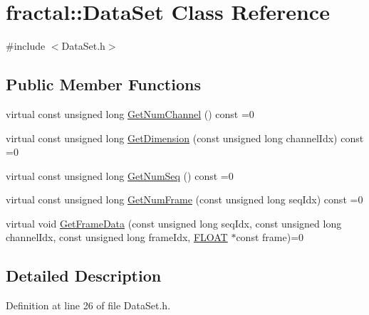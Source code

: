 \hypertarget{classfractal_1_1DataSet}{\section{fractal\+:\+:Data\+Set Class Reference}
\label{classfractal_1_1DataSet}
}


{\ttfamily \#include $<$Data\+Set.\+h$>$}

\subsection*{Public Member Functions}
\begin{DoxyCompactItemize}
\item 
virtual const unsigned long \hyperlink{classfractal_1_1DataSet_aa49ad76771b75f90a2abebb0161630b1}{Get\+Num\+Channel} () const =0
\item 
virtual const unsigned long \hyperlink{classfractal_1_1DataSet_ac4125586b4e24238d0bfb4d439b41195}{Get\+Dimension} (const unsigned long channel\+Idx) const =0
\item 
virtual const unsigned long \hyperlink{classfractal_1_1DataSet_a77fa290db2143cc18c161ff3f85077f2}{Get\+Num\+Seq} () const =0
\item 
virtual const unsigned long \hyperlink{classfractal_1_1DataSet_a83a59ea7372dbd74aa9a606042f236a1}{Get\+Num\+Frame} (const unsigned long seq\+Idx) const =0
\item 
virtual void \hyperlink{classfractal_1_1DataSet_ab4e10bf83d6a877e3c39533d075e4595}{Get\+Frame\+Data} (const unsigned long seq\+Idx, const unsigned long channel\+Idx, const unsigned long frame\+Idx, \hyperlink{namespacefractal_a1c2d2530689575d5ccb56bae52af70d3}{F\+L\+O\+A\+T} $\ast$const frame)=0
\end{DoxyCompactItemize}


\subsection{Detailed Description}


Definition at line 26 of file Data\+Set.\+h.




